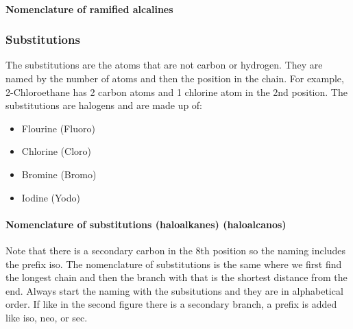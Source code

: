 \begin{center}
    \label{fig:2-Methylbutane}
\end{center}

\paragraph*{Nomenclature of ramified alcalines}
\begin{center}
\end{center}

\subsubsection{Substitutions}

The substitutions are the atoms that are not carbon or hydrogen. They are named by the number of atoms and then the position in the chain. For example, 2-Chloroethane has 2 carbon atoms and 1 chlorine atom in the 2nd position. The substitutions are halogens and are made up of:
\begin{itemize}
    \item Flourine (Fluoro)
    \item Chlorine (Cloro)
    \item Bromine (Bromo)
    \item Iodine (Yodo)
\end{itemize}

\paragraph{Nomenclature of substitutions (haloalkanes) (haloalcanos)}
\begin{center}
\end{center}
\begin{center}
\end{center}
\quad
Note that there is a secondary carbon in the 8th position so the naming includes the prefix iso.
\quad
The nomenclature of substitutions is the same where we first find the longest chain and then the branch with that is the shortest distance from the end. Always start the naming with the subsitutions and they are in alphabetical order. If like in the second figure there is a secondary branch, a prefix is added like iso, neo, or sec.
